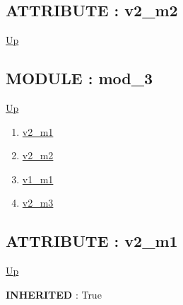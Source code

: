 \subsection*{ATTRIBUTE : v2\_m2}
\hypertarget{ecldoc:intest.example_2.mod_2.v2_m2}{}
\par
\begin{minipage}[t]{\textwidth}
\begin{flushleft}
  
\end{flushleft}
\end{minipage}
\hyperlink{ecldoc:intest.example_2.mod_2}{Up} \\
\par
\par

\subsection*{MODULE : mod\_3}
\hypertarget{ecldoc:intest.example_2.mod_3}{}
\par
\begin{minipage}[t]{\textwidth}
\begin{flushleft}
  
\end{flushleft}
\end{minipage}
\hyperlink{ecldoc:intest.example_2}{Up} \\
\par
\par
\begin{enumerate}
\item \hyperlink{ecldoc:intest.example_2.mod_1.v2_m1}{v2\_m1}
\item \hyperlink{ecldoc:intest.example_2.mod_2.v2_m2}{v2\_m2}
\item \hyperlink{ecldoc:intest.example_2.mod_3.v1_m1}{v1\_m1}
\item \hyperlink{ecldoc:intest.example_2.mod_3.v2_m3}{v2\_m3}
\end{enumerate}
\subsection*{ATTRIBUTE : v2\_m1}
\hypertarget{ecldoc:intest.example_2.mod_1.v2_m1}{}
\par
\begin{minipage}[t]{\textwidth}
\begin{flushleft}
  
\end{flushleft}
\end{minipage}
\hyperlink{ecldoc:intest.example_2.mod_3}{Up} \\
\par
\par
\textbf{INHERITED} : True \\
